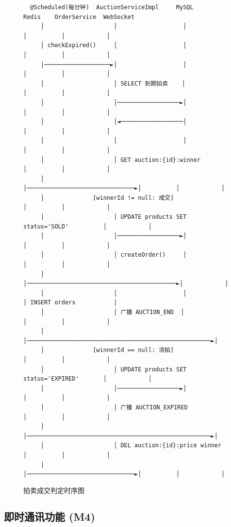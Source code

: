 \documentclass[12pt,a4paper]{ctexart}
\numberwithin{figure}{section}
\numberwithin{table}{section}
\begin{document}
\begin{figure}[H]
\centering
{\small
\begin{verbatim}
  @Scheduled(每分钟)  AuctionServiceImpl     MySQL        Redis    OrderService  WebSocket
     │                    │                   │            │          │            │
     │ checkExpired()     │                   │            │          │            │
     │───────────────────►│                   │            │          │            │
     │                    │ SELECT 到期拍卖    │            │          │            │
     │                    │──────────────────►│            │          │            │
     │                    │◄──────────────────│            │          │            │
     │                    │                   │            │          │            │
     │                    │ GET auction:{id}:winner        │          │            │
     │                    │───────────────────────────────►│          │            │
     │              [winnerId != null: 成交]               │          │            │
     │                    │ UPDATE products SET status='SOLD'          │            │
     │                    │──────────────────►│            │          │            │
     │                    │ createOrder()     │            │          │            │
     │                    │───────────────────────────────────────────►│            │
     │                    │                   │            │ INSERT orders           │
     │                    │ 广播 AUCTION_END  │            │          │            │
     │                    │─────────────────────────────────────────────────────►│
     │              [winnerId == null: 流拍]               │          │            │
     │                    │ UPDATE products SET status='EXPIRED'       │            │
     │                    │──────────────────►│            │          │            │
     │                    │ 广播 AUCTION_EXPIRED           │          │            │
     │                    │─────────────────────────────────────────────────────►│
     │                    │ DEL auction:{id}:price winner  │          │            │
     │                    │───────────────────────────────►│          │            │
\end{verbatim}
}
\caption{拍卖成交判定时序图}
\label{fig:m3-end-sequence}
\end{figure}

\subsection{即时通讯功能 (M4)}
\end{document}
